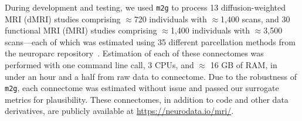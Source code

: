 During development and testing, we used \texttt{m2g} to process 13 diffusion-weighted MRI (dMRI) studies comprising $\approx$720 individuals with $\approx$1,400 scans, and 30 functional MRI (fMRI) studies comprising $\approx$1,400 individuals with $\approx$3,500 scans---each of which was estimated using 35 different parcellation methods from the neuroparc repository~\cite{neuroparc}. Estimation of each of these connectomes was performed with one command line call, 3 CPUs, and $\approx$ 16 GB of RAM, in under an hour and a half from raw data to connectome. Due to the robustness of \texttt{m2g}, each connectome was estimated without issue and passed our surrogate metrics for plausibility. These connectomes, in addition to code and other data derivatives, are publicly available at \url{https://neurodata.io/mri/}.




